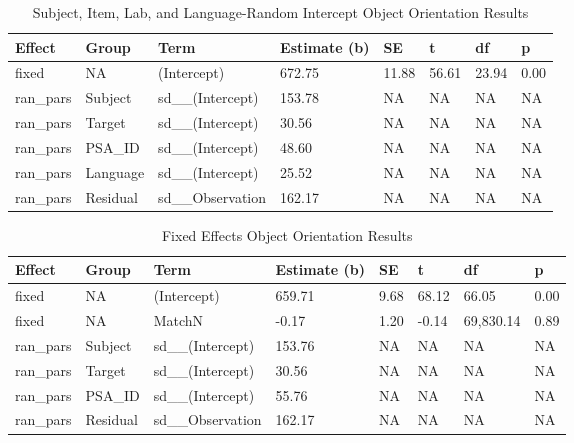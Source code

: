 \documentclass[
  man,floatsintext]{apa7}
\begin{document}
\begin{table}[tbp]

\begin{center}
\begin{threeparttable}

\caption{\label{tab:lang}Subject, Item, Lab, and Language-Random Intercept Object Orientation Results}

\begin{tabular}{llllllll}
\toprule
Effect & Group & Term & Estimate (b) & SE & t & df & p\\
\midrule
fixed & NA & (Intercept) & 672.75 & 11.88 & 56.61 & 23.94 & 0.00\\
ran\_pars & Subject & sd\_\_(Intercept) & 153.78 & NA & NA & NA & NA\\
ran\_pars & Target & sd\_\_(Intercept) & 30.56 & NA & NA & NA & NA\\
ran\_pars & PSA\_ID & sd\_\_(Intercept) & 48.60 & NA & NA & NA & NA\\
ran\_pars & Language & sd\_\_(Intercept) & 25.52 & NA & NA & NA & NA\\
ran\_pars & Residual & sd\_\_Observation & 162.17 & NA & NA & NA & NA\\
\bottomrule
\end{tabular}

\end{threeparttable}
\end{center}

\end{table}

\begin{table}[tbp]

\begin{center}
\begin{threeparttable}

\caption{\label{tab:fixed}Fixed Effects Object Orientation Results}

\begin{tabular}{llllllll}
\toprule
Effect & Group & Term & Estimate (b) & SE & t & df & p\\
\midrule
fixed & NA & (Intercept) & 659.71 & 9.68 & 68.12 & 66.05 & 0.00\\
fixed & NA & MatchN & -0.17 & 1.20 & -0.14 & 69,830.14 & 0.89\\
ran\_pars & Subject & sd\_\_(Intercept) & 153.76 & NA & NA & NA & NA\\
ran\_pars & Target & sd\_\_(Intercept) & 30.56 & NA & NA & NA & NA\\
ran\_pars & PSA\_ID & sd\_\_(Intercept) & 55.76 & NA & NA & NA & NA\\
ran\_pars & Residual & sd\_\_Observation & 162.17 & NA & NA & NA & NA\\
\bottomrule
\end{tabular}

\end{threeparttable}
\end{center}

\end{table}
\end{document}

